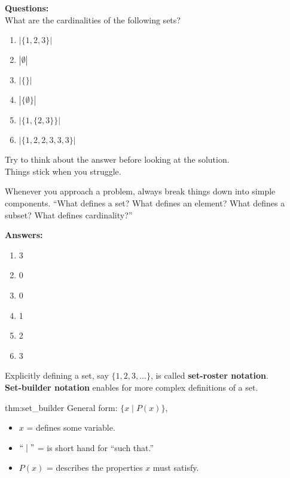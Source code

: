 \noindent
\textbf{Questions:}\\
What are the cardinalities of the following sets?
\begin{enumerate}
    \item $|\{1,2,3\}|$
    \item $|\emptyset|$
    \item $|\{\}|$
    \item $|\{\emptyset\}|$
    \item $|\{1,\{2,3\}\}|$
    \item $|\{1,2,2,3,3,3\}|$
\end{enumerate}

\vspace{1em}

\noindent
Try to think about the answer before looking at the solution.\\
Things stick when you struggle.\\

\begin{Tip}
    Whenever you approach a problem, always break things down into simple components.
    ``What defines a set? What defines an element? What defines a subset? What defines cardinality?''\\
\end{Tip}

\noindent
\textbf{Answers:}
\begin{enumerate}
    \item 3
    \item 0
    \item 0
    \item 1
    \item 2
    \item 3
\end{enumerate}

\newpage

\noindent
Explicitly defining a set, say $\{1, 2, 3, ...\}$, is called \textbf{set-roster notation}.\\
\textbf{Set-builder notation} enables for more complex definitions of a set.

\begin{theo}{thm:set_builder}
    General form: $\{x \mid P(x)\}$,
    \begin{itemize}
        \item $x$ = defines some variable.
        \item $``\mid"$ = is short hand for ``such that.''
        \item $P(x)$ = describes the properties $x$ must satisfy.
    \end{itemize}
\end{theo}

